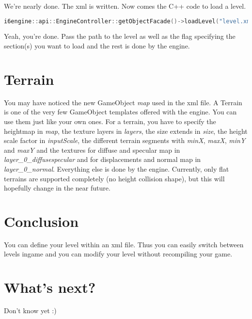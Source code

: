\documentclass{article}
\begin{document}
We're nearly done. The xml is written. Now comes the C++ code to load a level.

\begin{lstlisting}[language=C++, style=basic, caption={loading a level}, label=code:load]
i6engine::api::EngineController::getObjectFacade()->loadLevel("level.xml", "A");
\end{lstlisting}

Yeah, you're done. Pass the path to the level as well as the flag specifying the section(s) you want to load and the rest is done by the engine.

\section{Terrain}

You may have noticed the new GameObject \textit{map} used in the xml file. A Terrain is one of the very few GameObject templates offered with the engine. You can use them just like your own ones. For a terrain, you have to specify the heightmap in \textit{map}, the texture layers in \textit{layers}, the size extends in \textit{size}, the height scale factor in \textit{inputScale}, the different terrain segments with \textit{minX}, \textit{maxX}, \textit{minY} and \textit{maxY} and the textures for diffuse and specular map in \textit{layer\_{}0\_{}diffusespecular} and for displacements and normal map in \textit{layer\_{}0\_{}normal}. Everything else is done by the engine. Currently, only flat terrains are supported completely (no height collision shape), but this will hopefully change in the near future.

\section{Conclusion}

You can define your level within an xml file. Thus you can easily switch between levels ingame and you can modify your level without recompiling your game.

\section{What's next?}

Don't know yet :)
\end{document}
